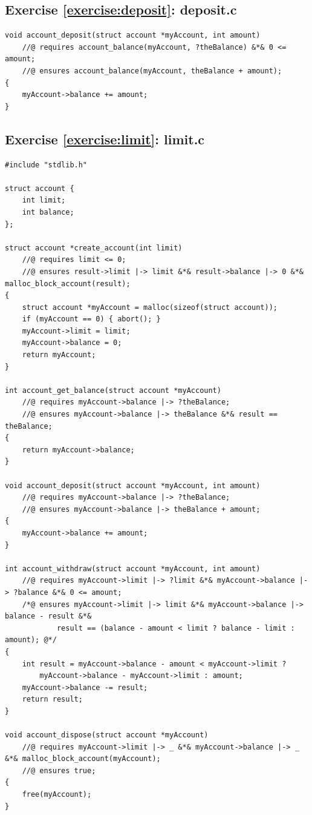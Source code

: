 \documentclass{article}
\begin{document}
\subsection{Exercise \ref{exercise:deposit}: deposit.c}

\begin{lstlisting}
void account_deposit(struct account *myAccount, int amount)
    //@ requires account_balance(myAccount, ?theBalance) &*& 0 <= amount;
    //@ ensures account_balance(myAccount, theBalance + amount);
{
    myAccount->balance += amount;
}
\end{lstlisting}

\subsection{Exercise \ref{exercise:limit}: limit.c}

\begin{lstlisting}
#include "stdlib.h"

struct account {
    int limit;
    int balance;
};

struct account *create_account(int limit)
    //@ requires limit <= 0;
    //@ ensures result->limit |-> limit &*& result->balance |-> 0 &*& malloc_block_account(result);
{
    struct account *myAccount = malloc(sizeof(struct account));
    if (myAccount == 0) { abort(); }
    myAccount->limit = limit;
    myAccount->balance = 0;
    return myAccount;
}

int account_get_balance(struct account *myAccount)
    //@ requires myAccount->balance |-> ?theBalance;
    //@ ensures myAccount->balance |-> theBalance &*& result == theBalance;
{
    return myAccount->balance;
}

void account_deposit(struct account *myAccount, int amount)
    //@ requires myAccount->balance |-> ?theBalance;
    //@ ensures myAccount->balance |-> theBalance + amount;
{
    myAccount->balance += amount;
}

int account_withdraw(struct account *myAccount, int amount)
    //@ requires myAccount->limit |-> ?limit &*& myAccount->balance |-> ?balance &*& 0 <= amount;
    /*@ ensures myAccount->limit |-> limit &*& myAccount->balance |-> balance - result &*&
            result == (balance - amount < limit ? balance - limit : amount); @*/
{
    int result = myAccount->balance - amount < myAccount->limit ?
        myAccount->balance - myAccount->limit : amount;
    myAccount->balance -= result;
    return result;
}

void account_dispose(struct account *myAccount)
    //@ requires myAccount->limit |-> _ &*& myAccount->balance |-> _ &*& malloc_block_account(myAccount);
    //@ ensures true;
{
    free(myAccount);
}
\end{lstlisting}
\end{document}
